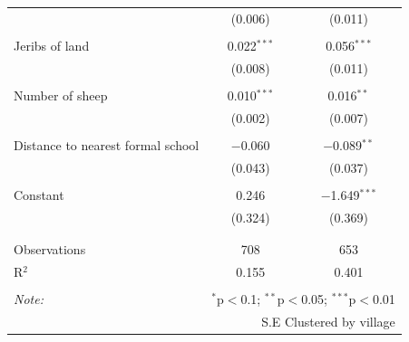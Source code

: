 \documentclass[
]{article}
\begin{document}
\begin{table}[!htbp]
\begin{tabular}{@{\extracolsep{5pt}}lcc}
  & (0.006) & (0.011) \\ 
  & & \\ 
 Jeribs of land & 0.022$^{***}$ & 0.056$^{***}$ \\ 
  & (0.008) & (0.011) \\ 
  & & \\ 
 Number of sheep & 0.010$^{***}$ & 0.016$^{**}$ \\ 
  & (0.002) & (0.007) \\ 
  & & \\ 
 Distance to nearest formal school & $-$0.060 & $-$0.089$^{**}$ \\ 
  & (0.043) & (0.037) \\ 
  & & \\ 
 Constant & 0.246 & $-$1.649$^{***}$ \\ 
  & (0.324) & (0.369) \\ 
  & & \\ 
\hline \\[-1.8ex] 
Observations & 708 & 653 \\ 
R$^{2}$ & 0.155 & 0.401 \\ 
\hline 
\hline \\[-1.8ex] 
\textit{Note:}  & \multicolumn{2}{r}{$^{*}$p$<$0.1; $^{**}$p$<$0.05; $^{***}$p$<$0.01} \\ 
 & \multicolumn{2}{r}{S.E Clustered by village} \\ 
\end{tabular} 
\end{table}
\end{document}
